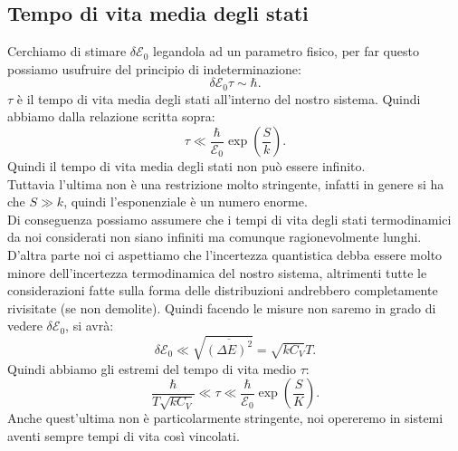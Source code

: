 \subsection{Tempo di vita media degli stati}%
Cerchiamo di stimare $\delta \mathcal{E} _{0}$ legandola ad un parametro fisico, per far questo possiamo usufruire del principio di indeterminazione:
\[
	\delta \mathcal{E} _{0} \tau  \sim \hbar
.\] 
$\tau $ è il tempo di vita media degli stati all'interno del nostro sistema.
Quindi abbiamo dalla relazione scritta sopra:
\[
	\tau \ll \frac{\hbar}{\mathcal{E}_{0} }\exp\left( \frac{S}{k} \right) 
.\] 
Quindi il tempo di vita media degli stati non può essere infinito.\\
Tuttavia l'ultima non è una restrizione molto stringente, infatti in genere si ha che $S \gg k$, quindi l'esponenziale è un numero enorme. \\
Di conseguenza possiamo assumere che i tempi di vita degli stati termodinamici da noi considerati non siano infiniti ma comunque ragionevolmente lunghi. \\
D'altra parte noi ci aspettiamo che l'incertezza quantistica debba essere molto minore dell'incertezza termodinamica del nostro sistema, altrimenti tutte le considerazioni fatte sulla forma delle distribuzioni andrebbero completamente rivisitate (se non demolite). Quindi facendo le misure non saremo in grado di vedere $\delta \mathcal{E} _{0}$, si avrà:
\[
	\delta \mathcal{E} _{0}\ll \sqrt{\overline{\left( \Delta E \right) ^2}} = \sqrt{k C_{V}} T
.\] 
Quindi abbiamo gli estremi del tempo di vita medio $\tau $:
\[
	\frac{\hbar}{T\sqrt{k C_{V}} } \ll \tau \ll \frac{\hbar}{\mathcal{E}_{0} } \exp\left( \frac{S}{K} \right) 
.\] 
Anche quest'ultima non è particolarmente stringente, noi opereremo in sistemi aventi sempre tempi di vita così vincolati.\\
